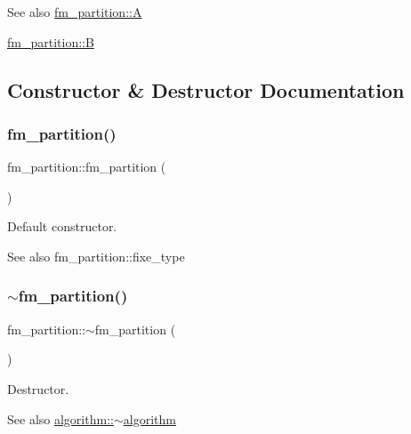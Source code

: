 \begin{DoxySeeAlso}{See also}
\mbox{\hyperlink{classfm__partition_a973d30e9eb0d21f659ef288176cd4791}{fm\+\_\+partition\+::A}} 

\mbox{\hyperlink{classfm__partition_a42515c44eecb7ba3e2ec549a877ef238}{fm\+\_\+partition\+::B}} 
\end{DoxySeeAlso}


\subsection{Constructor \& Destructor Documentation}
\mbox{\label{classfm__partition_a69f37c22abf6df5b3778623512240106}} 
\subsubsection{\texorpdfstring{fm\+\_\+partition()}{fm\_partition()}}
{\footnotesize\ttfamily fm\+\_\+partition\+::fm\+\_\+partition (\begin{DoxyParamCaption}{ }\end{DoxyParamCaption})}

Default constructor.

\begin{DoxySeeAlso}{See also}
fm\+\_\+partition\+::fixe\+\_\+type 
\end{DoxySeeAlso}
\mbox{\label{classfm__partition_ab9d4f12de8f65d42240d94f7924fb319}} 
\subsubsection{\texorpdfstring{$\sim$fm\+\_\+partition()}{~fm\_partition()}}
{\footnotesize\ttfamily fm\+\_\+partition\+::$\sim$fm\+\_\+partition (\begin{DoxyParamCaption}{ }\end{DoxyParamCaption})\hspace{0.3cm}{\ttfamily [virtual]}}

Destructor.

\begin{DoxySeeAlso}{See also}
\mbox{\hyperlink{classalgorithm_adca9b1e7fa3afd914519a9dbb44e9fd5}{algorithm\+::$\sim$algorithm}} 
\end{DoxySeeAlso}



